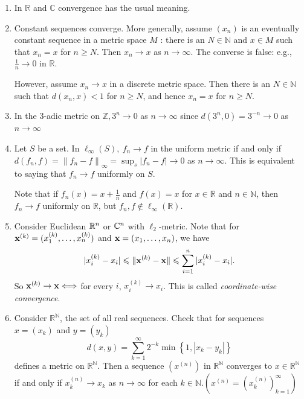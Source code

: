 \documentclass[a4paper,11pt]{article}
\begin{document}
\begin{example}
    \begin{enumerate}
        \item In $\mathbb{R}$ and $\mathbb{C}$ convergence has the usual meaning.
        \item Constant sequences converge. More generally, assume $\left(x_{n}\right)$ is an eventually constant sequence in a metric space $M$ : there is an $N \in \mathbb{N}$ and $x \in M$ such that $x_{n}=x$ for $n \geqslant N$. Then $x_{n} \rightarrow x$ as $n \rightarrow \infty$.
        The converse is false: e.g., $\frac{1}{n} \rightarrow 0$ in $\mathbb{R}$.

        However, assume $x_{n} \rightarrow x$ in a discrete metric space. Then there is an $N \in \mathbb{N}$ such that $d\left(x_{n}, x\right)<1$ for $n \geqslant N$, and hence $x_{n}=x$ for $n \geqslant N$.
        \item In the 3-adic metric on $\mathbb{Z}, 3^{n} \rightarrow 0$ as $n \rightarrow \infty$ since $d\left(3^{n}, 0\right)=3^{-n} \rightarrow 0$ as $n \rightarrow \infty$
        \item Let $S$ be a set. In $\ell_{\infty}(S),\ f_{n} \rightarrow f$ in the uniform metric if and only if $d\left(f_{n}, f\right)=\left\|f_{n}-f\right\|_{\infty}=\sup _{s}\left|f_{n}-f\right| \rightarrow 0$ as $n \rightarrow \infty$. This is equivalent to saying that $f_{n} \rightarrow f$ uniformly on $S$.
        
        Note that if $f_{n}(x)=x+\frac{1}{n}$ and $f(x)=x$ for $x \in \mathbb{R}$ and $n \in \mathbb{N}$, then $f_{n} \rightarrow f$ uniformly on $\mathbb{R}$, but $f_{n}, f \notin \ell_{\infty}(\mathbb{R})$.
        \item Consider Euclidean $ {\mathbb{R}}^n $ or $ {\mathbb{C}}^n $ with $ \ell_2 $-metric. Note that for $ {\bf x}^{(k)}=(x_1^{(k)},\dots,x_n^{(k)}) $ and $ {\bf x}=(x_1,\dots,x_n) $, we have 
        \[
            | x_i^{(k)}-x_i | \leqslant \| {\bf x}^{(k)}-{\bf x} \| \leqslant \sum_{i=1}^{n}| x_i^{(k)}-x_i |.
        \]
        So $ {\bf x}^{(k)}\to {\bf x} \Longleftrightarrow $ for every $i$, $ x_i^{(k)}\to x_i $. This is called \textit{coordinate-wise convergence}.
        \item Consider $\mathbb{R}^{\mathbb{N}}$, the set of all real sequences. Check that for sequences $x=\left(x_{k}\right)$ and $y=\left(y_{k}\right)$
        \[
        d(x, y)=\sum_{k=1}^{\infty} 2^{-k} \min \left\{1,\left|x_{k}-y_{k}\right|\right\}
        \]
        defines a metric on $\mathbb{R}^{\mathbb{N}}$. Then a sequence $\left(x^{(n)}\right)$ in $\mathbb{R}^{\mathbb{N}}$ converges to $x \in \mathbb{R}^{\mathbb{N}}$ if and only if $x_{k}^{(n)} \rightarrow x_{k}$ as $n \rightarrow \infty$ for each $k \in \mathbb{N} .\left(x^{(n)}=\left(x_{k}^{(n)}\right)_{k=1}^{\infty}\right)$ 
        

\end{enumerate}
\end{example}
\end{document}
